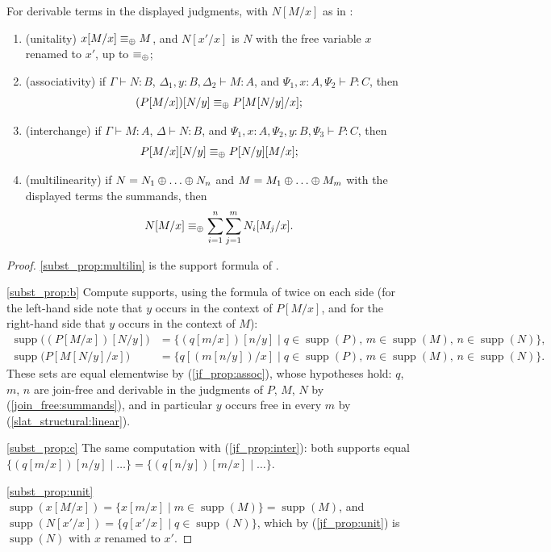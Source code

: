 \begin{lemma}
\label{lemma:subst_properties}
For derivable terms in the displayed judgments, with $N[M/x]$ as in :
\begin{enumerate}
  \item\label{subst_prop:unit} (unitality) $x[M/x] \equiv_{\mathbin{\oplus}} M$, and $N[x'/x]$ is $N$ with the free variable $x$ renamed to $x'$, up to $\equiv_{\mathbin{\oplus}}$;
  \item\label{subst_prop:b} (associativity) if $\Gamma \vdash N : B$, $\Delta_1, y : B, \Delta_2 \vdash M : A$, and $\Psi_1, x : A, \Psi_2 \vdash P : C$, then
  \[
  (P[M/x])[N/y] \equiv_{\mathbin{\oplus}} P[M[N/y]/x];
  \]
  \item\label{subst_prop:c} (interchange) if $\Gamma \vdash M : A$, $\Delta \vdash N : B$, and $\Psi_1, x : A, \Psi_2, y : B, \Psi_3 \vdash P : C$, then
  \[
  P[M/x][N/y] \equiv_{\mathbin{\oplus}} P[N/y][M/x];
  \]
  \item\label{subst_prop:multilin} (multilinearity) if $N = N_1 \mathbin{\oplus} \ldots \mathbin{\oplus} N_n$ and $M = M_1 \mathbin{\oplus} \ldots \mathbin{\oplus} M_m$ with the displayed terms the summands, then
  \[
  N[M/x] \equiv_{\mathbin{\oplus}} \sum_{i=1}^{n} \sum_{j=1}^{m} N_i[M_j/x].
  \]
\end{enumerate}
\end{lemma}
\begin{proof}
\ref{subst_prop:multilin} is the support formula of .

\ref{subst_prop:b} Compute supports, using the formula of  twice on each side (for the left-hand side note that $y$ occurs in the context of $P[M/x]$, and for the right-hand side that $y$ occurs in the context of $M$):
\begin{align*}
\operatorname{supp}\bigl((P[M/x])[N/y]\bigr) &= \{ (q[m/x])[n/y] \mid q \in \operatorname{supp}(P),\, m \in \operatorname{supp}(M),\, n \in \operatorname{supp}(N) \},\\
\operatorname{supp}\bigl(P[M[N/y]/x]\bigr) &= \{ q[(m[n/y])/x] \mid q \in \operatorname{supp}(P),\, m \in \operatorname{supp}(M),\, n \in \operatorname{supp}(N) \}.
\end{align*}
These sets are equal elementwise by (\ref{jf_prop:assoc}), whose hypotheses hold: $q$, $m$, $n$ are join-free and derivable in the judgments of $P$, $M$, $N$ by (\ref{join_free:summands}), and in particular $y$ occurs free in every $m$ by (\ref{slat_structural:linear}).

\ref{subst_prop:c} The same computation with (\ref{jf_prop:inter}):
both supports equal $\{ (q[m/x])[n/y] \mid \ldots \} = \{ (q[n/y])[m/x] \mid \ldots \}$.

\ref{subst_prop:unit} $\operatorname{supp}(x[M/x]) = \{x[m/x] \mid m \in \operatorname{supp}(M)\} = \operatorname{supp}(M)$, and $\operatorname{supp}(N[x'/x]) = \{q[x'/x] \mid q \in \operatorname{supp}(N)\}$, which by (\ref{jf_prop:unit}) is $\operatorname{supp}(N)$ with $x$ renamed to $x'$.
\end{proof}

